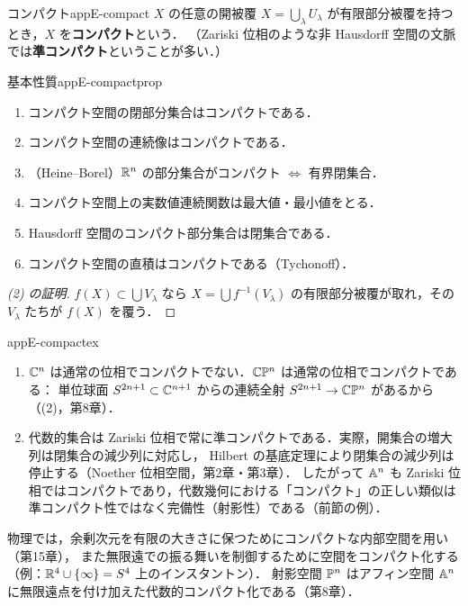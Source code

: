 \begin{mydef}{コンパクト}{appE-compact}
$X$ の任意の開被覆 $X=\bigcup_\lambda U_\lambda$ が有限部分被覆を持つとき，$X$ を\textbf{コンパクト}という．
（Zariski 位相のような非 Hausdorff 空間の文脈では\textbf{準コンパクト}ということが多い．）
\end{mydef}

\begin{mythm}{基本性質}{appE-compactprop}
\begin{enumerate}
\item コンパクト空間の閉部分集合はコンパクトである．
\item コンパクト空間の連続像はコンパクトである．
\item （Heine--Borel）$\mathbb{R}^n$ の部分集合がコンパクト $\iff$ 有界閉集合．
\item コンパクト空間上の実数値連続関数は最大値・最小値をとる．
\item Hausdorff 空間のコンパクト部分集合は閉集合である．
\item コンパクト空間の直積はコンパクトである（Tychonoff）．
\end{enumerate}
\end{mythm}
\begin{proof}[(2) の証明]
$f(X)\subset\bigcup V_\lambda$ なら $X=\bigcup f^{-1}(V_\lambda)$ の有限部分被覆が取れ，その $V_\lambda$ たちが $f(X)$ を覆う．
\end{proof}

\begin{myex}{}{appE-compactex}
\begin{enumerate}
\item $\mathbb{C}^n$ は通常の位相でコンパクトでない．$\mathbb{C}\mathbb{P}^n$ は通常の位相でコンパクトである：
単位球面 $S^{2n+1}\subset\mathbb{C}^{n+1}$ からの連続全射 $S^{2n+1}\to\mathbb{C}\mathbb{P}^n$ があるから（(2)，第8章）．
\item 代数的集合は Zariski 位相で常に準コンパクトである．実際，開集合の増大列は閉集合の減少列に対応し，
Hilbert の基底定理により閉集合の減少列は停止する（Noether 位相空間，第2章・第3章）．
したがって $\mathbb{A}^n$ も Zariski 位相ではコンパクトであり，代数幾何における「コンパクト」の正しい類似は
準コンパクト性ではなく完備性（射影性）である（前節の例）．
\end{enumerate}
\end{myex}

\begin{physbox}[コンパクト化]
物理では，余剰次元を有限の大きさに保つためにコンパクトな内部空間を用い（第15章），
また無限遠での振る舞いを制御するために空間をコンパクト化する（例：$\mathbb{R}^4\cup\{\infty\}=S^4$ 上のインスタントン）．
射影空間 $\mathbb{P}^n$ はアフィン空間 $\mathbb{A}^n$ に無限遠点を付け加えた代数的コンパクト化である（第8章）．
\end{physbox}

